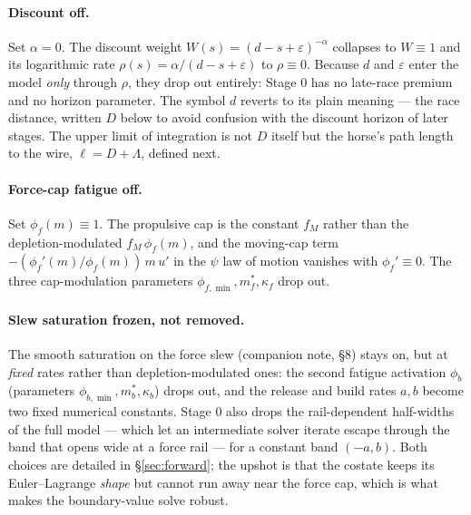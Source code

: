 \documentclass[11pt]{article}
\begin{document}
\paragraph{Discount off.} Set $\alpha = 0$. The discount weight $W(s) = (d - s + \varepsilon)^{-\alpha}$ collapses to $W \equiv 1$ and its logarithmic rate $\rho(s) = \alpha/(d - s + \varepsilon)$ to $\rho \equiv 0$. Because $d$ and $\varepsilon$ enter the model \emph{only} through $\rho$, they drop out entirely: Stage 0 has no late-race premium and no horizon parameter. The symbol $d$ reverts to its plain meaning --- the race distance, written $D$ below to avoid confusion with the discount horizon of later stages. The upper limit of integration is not $D$ itself but the horse's path length to the wire, $\ell = D + \Lambda$, defined next.

\paragraph{Force-cap fatigue off.} Set $\phi_f(m) \equiv 1$. The propulsive cap is the constant $f_M$ rather than the depletion-modulated $f_M\,\phi_f(m)$, and the moving-cap term $-(\phi_f'(m)/\phi_f(m))\,m\,u'$ in the $\psi$ law of motion vanishes with $\phi_f' \equiv 0$. The three cap-modulation parameters $\phi_{f,\min}, m_f^*, \kappa_f$ drop out.

\paragraph{Slew saturation frozen, not removed.} The smooth saturation on the force slew (companion note, \S8) stays on, but at \emph{fixed} rates rather than depletion-modulated ones: the second fatigue activation $\phi_b$ (parameters $\phi_{b,\min}, m_b^*, \kappa_b$) drops out, and the release and build rates $a, b$ become two fixed numerical constants. Stage 0 also drops the rail-dependent half-widths of the full model --- which let an intermediate solver iterate escape through the band that opens wide at a force rail --- for a constant band $(-a, b)$. Both choices are detailed in \S\ref{sec:forward}; the upshot is that the costate keeps its Euler--Lagrange \emph{shape} but cannot run away near the force cap, which is what makes the boundary-value solve robust.
\end{document}
